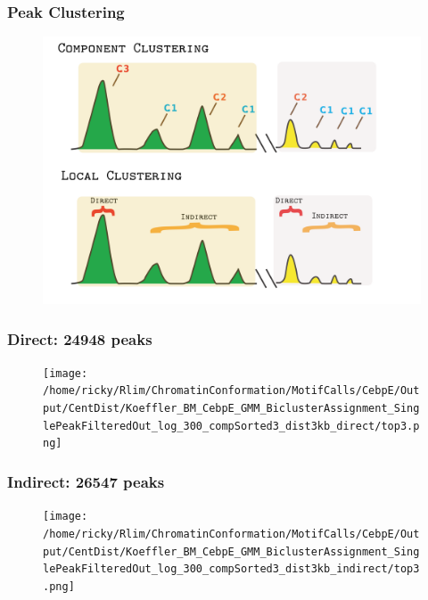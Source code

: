 \documentclass[notes]{beamer}
\begin{document}
\begin{frame}[plain]
    \frametitle{Peak Clustering}
    \begin{figure}
        \includegraphics[width=1\textwidth, height=0.6\textwidth]{../Images/LocalClustering.png}
    \end{figure}
\end{frame}

\begin{frame}[plain]
    \frametitle{Direct: 24948 peaks}
    \begin{figure}
        \texttt{[image: /home/ricky/Rlim/ChromatinConformation/MotifCalls/CebpE/Output/CentDist/Koeffler\_BM\_CebpE\_GMM\_BiclusterAssignment\_SinglePeakFilteredOut\_log\_300\_compSorted3\_dist3kb\_direct/top3.png]}
    \end{figure}
\end{frame}

\begin{frame}[plain]
    \frametitle{Indirect: 26547 peaks}
    \begin{figure}
        \texttt{[image: /home/ricky/Rlim/ChromatinConformation/MotifCalls/CebpE/Output/CentDist/Koeffler\_BM\_CebpE\_GMM\_BiclusterAssignment\_SinglePeakFilteredOut\_log\_300\_compSorted3\_dist3kb\_indirect/top3.png]}
    \end{figure}
\end{frame}
\end{document}
